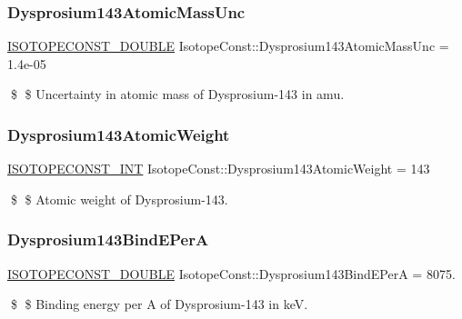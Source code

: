 \subsubsection{\texorpdfstring{Dysprosium143\+Atomic\+Mass\+Unc}{Dysprosium143AtomicMassUnc}}
{\footnotesize\ttfamily \mbox{\hyperlink{group___isotope_const-_macros_ga8f45a7272ce02c0b4c65c44636ed719a}{I\+S\+O\+T\+O\+P\+E\+C\+O\+N\+S\+T\+\_\+\+D\+O\+U\+B\+LE}} Isotope\+Const\+::\+Dysprosium143\+Atomic\+Mass\+Unc = 1.\+4e-\/05}

\$ \$ Uncertainty in atomic mass of Dysprosium-\/143 in amu. \mbox{\label{group___isotope_const-_dysprosium-_dy143_gaf81a09a01784acf00824641e7397063f}} 
\subsubsection{\texorpdfstring{Dysprosium143\+Atomic\+Weight}{Dysprosium143AtomicWeight}}
{\footnotesize\ttfamily \mbox{\hyperlink{group___isotope_const-_macros_ga5f18360b3e99483a35c32d789e62621c}{I\+S\+O\+T\+O\+P\+E\+C\+O\+N\+S\+T\+\_\+\+I\+NT}} Isotope\+Const\+::\+Dysprosium143\+Atomic\+Weight = 143}

\$ \$ Atomic weight of Dysprosium-\/143. \mbox{\label{group___isotope_const-_dysprosium-_dy143_gaa1c24a006d3079035eab9edc0eaa3094}} 
\subsubsection{\texorpdfstring{Dysprosium143\+Bind\+E\+PerA}{Dysprosium143BindEPerA}}
{\footnotesize\ttfamily \mbox{\hyperlink{group___isotope_const-_macros_ga8f45a7272ce02c0b4c65c44636ed719a}{I\+S\+O\+T\+O\+P\+E\+C\+O\+N\+S\+T\+\_\+\+D\+O\+U\+B\+LE}} Isotope\+Const\+::\+Dysprosium143\+Bind\+E\+PerA = 8075.}

\$ \$ Binding energy per A of Dysprosium-\/143 in keV. \mbox{\label{group___isotope_const-_dysprosium-_dy143_gabc2829a507cfd75a8b2e2a49ebd51ddc}} 
